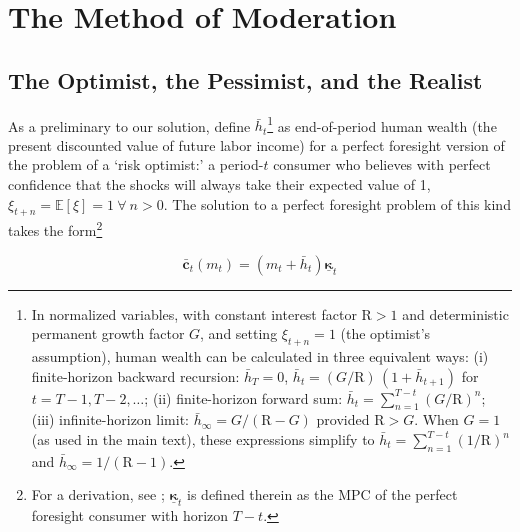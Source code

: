 \documentclass[twocolumn, switch]{article}
\newcommand{\Ex}{\mathbf{\mathbb{E}}}
\newcommand{\Rfree}{\text{R}}
\newcommand{\tranShk}{\xi}
\newcommand{\PermGroFac}{G}
\newcommand{\mNrm}{m}
\newcommand{\cFunc}{\mathbf{c}}
\newcommand{\cFuncOpt}{\bar{\cFunc}}
\newcommand{\hNrm}{h}
\newcommand{\hNrmOpt}{\bar{\hNrm}}
\newcommand{\MPC}{\boldsymbol{\kappa}}
\newcommand{\MPCmin}{\underline{\MPC}}
\begin{document}
\section{The Method of Moderation}

\subsection{The Optimist, the Pessimist, and the Realist}

As a preliminary to our solution, define $\hNrmOpt_{t}$\footnote{In normalized variables, with constant interest factor $\Rfree>1$ and
deterministic permanent growth factor $\PermGroFac$, and setting
$\tranShk_{t+n}=1$ (the optimist's assumption), human wealth can be
calculated in three equivalent ways: (i) finite-horizon backward recursion:
$\hNrmOpt_{T} = 0$, $\hNrmOpt_{t} = (\PermGroFac/\Rfree)\,(1 + \hNrmOpt_{t+1})$
for $t = T -1, T -2, \ldots$; (ii) finite-horizon forward sum:
$\hNrmOpt_{t} = \sum_{n=1}^{T -t}(\PermGroFac/\Rfree)^{n}$; (iii) infinite-horizon
limit: $\hNrmOpt_{\infty} = \PermGroFac/(\Rfree -\PermGroFac)$ provided
$\Rfree>\PermGroFac$. When $\PermGroFac=1$ (as used in the main text),
these expressions simplify to $\hNrmOpt_{t} = \sum_{n=1}^{T -t}(1/\Rfree)^{n}$
and $\hNrmOpt_{\infty} = 1/(\Rfree -1)$.}
as end-of-period human wealth (the present discounted value of future labor
income) for a perfect foresight version of the problem of a `risk optimist:' a
period-$t$ consumer who believes with perfect confidence that the shocks will
always take their expected value of 1,
$\tranShk_{t+n} = \Ex[\tranShk]=1~\forall~n>0$. The solution to a perfect
foresight problem of this kind takes the form\footnote{For a derivation, see \citet{CarrollShanker2024}; $\MPCmin_{t}$ is defined therein as the MPC of the perfect foresight consumer with horizon $T -t$.}

\begin{equation}
\label{eq:cFuncOpt}
\cFuncOpt_{t}(\mNrm_{t}) = (\mNrm_{t} + \hNrmOpt_{t})\MPCmin_{t}
\end{equation}
\end{document}
